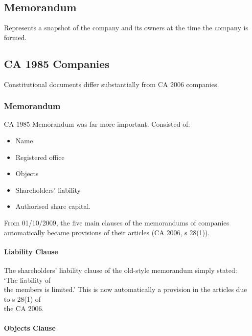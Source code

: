 \documentclass[
]{article}
\providecommand{\tightlist}{%
  \setlength{\itemsep}{0pt}\setlength{\parskip}{0pt}}
\begin{document}
\hypertarget{memorandum}{%
\subsection{Memorandum}\label{memorandum}}

Represents a snapshot of the company and its owners at the time the
company is formed.

\hypertarget{ca-1985-companies}{%
\subsection{CA 1985 Companies}\label{ca-1985-companies}}

Constitutional documents differ substantially from CA 2006 companies.

\hypertarget{memorandum-1}{%
\subsubsection{Memorandum}\label{memorandum-1}}

CA 1985 Memorandum was far more important. Consisted of:

\begin{itemize}
\tightlist
\item
  Name
\item
  Registered office
\item
  Objects
\item
  Shareholders' liability
\item
  Authorised share capital.
\end{itemize}

From 01/10/2009, the five main clauses of the memorandums of companies
automatically became provisions of their articles (CA 2006, s 28(1)).

\hypertarget{liability-clause}{%
\paragraph{Liability Clause}\label{liability-clause}}

The shareholders' liability clause of the old-style memorandum simply
stated: `The liability of\\
the members is limited.' This is now automatically a provision in the
articles due to s 28(1) of\\
the CA 2006.

\hypertarget{objects-clause}{%
\paragraph{Objects Clause}\label{objects-clause}}
\end{document}
